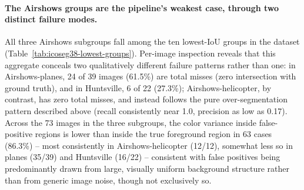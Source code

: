 \paragraph{The Airshows groups are the pipeline's weakest case, through two distinct failure modes.} All three Airshows subgroups fall among the ten lowest-IoU groups in the dataset (Table~\ref{tab:icoseg38-lowest-groups}). Per-image inspection reveals that this aggregate conceals two qualitatively different failure patterns rather than one: in Airshows-planes, 24 of 39 images (61.5\%) are total misses (zero intersection with ground truth), and in Huntsville, 6 of 22 (27.3\%); Airshows-helicopter, by contrast, has zero total misses, and instead follows the pure over-segmentation pattern described above (recall consistently near 1.0, precision as low as 0.17). Across the 73 images in the three subgroups, the color variance inside false-positive regions is lower than inside the true foreground region in 63 cases (86.3\%) -- most consistently in Airshows-helicopter (12/12), somewhat less so in planes (35/39) and Huntsville (16/22) -- consistent with false positives being predominantly drawn from large, visually uniform background structure rather than from generic image noise, though not exclusively so.

